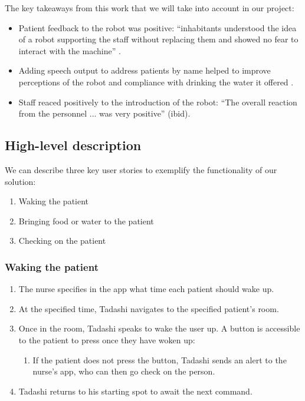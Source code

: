 \documentclass{article}
\begin{document}
The key takeaways from this work that we will take into account in our project:
\begin{itemize}
\item Patient feedback to the robot was positive: ``inhabitants  understood  the  idea  of  a  robot  supporting  the  staff  without replacing them and showed no fear to interact with the machine'' \cite{springer}. 
\item Adding speech output to address patients by name helped to improve perceptions of the robot and compliance with drinking the water it offered \cite{ieee}. 
\item Staff reaced positively to the introduction of the robot: ``The overall reaction from the personnel ... was very positive'' (ibid). 
\end{itemize}

\subsection{High-level description} 
We can describe three key user stories to exemplify the functionality of our solution:
\begin{enumerate}
\item Waking the patient
\item Bringing food or water to the patient
\item Checking on the patient
\end{enumerate}

\subsubsection{Waking the patient}
\begin{enumerate}
\item The nurse specifies in the app what time each patient should wake up.
\item At the specified time, Tadashi navigates to the specified patient's room.
\item Once in the room, Tadashi speaks to wake the user up. A button is accessible to the patient to press once they have woken up:
  \begin{enumerate} 
  \item If the patient does not press the button, Tadashi sends an alert to the nurse's app, who can then go check on the person. 
  \end{enumerate}
\item Tadashi returns to his starting spot to await the next command. 
\end{enumerate}
\end{document}
